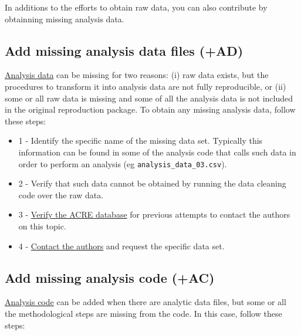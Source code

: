 \documentclass[]{book}
\providecommand{\tightlist}{%
  \setlength{\itemsep}{0pt}\setlength{\parskip}{0pt}}
\begin{document}
In additions to the efforts to obtain raw data, you can also contribute by obtainning missing analysis data.

\hypertarget{ad}{%
\subsection{Add missing analysis data files (+AD)}\label{ad}}

\protect\hyperlink{describe-inputs}{Analysis data} can be missing for two reasons: (i) raw data exists, but the procedures to transform it into analysis data are not fully reproducible, or (ii) some or all raw data is missing and some of all the analysis data is not included in the original reproduction package. To obtain any missing analysis data, follow these steps:

\begin{itemize}
\tightlist
\item
  1 - Identify the specific name of the missing data set. Typically this information can be found in some of the analysis code that calls such data in order to perform an analysis (eg \texttt{analysis\_data\_03.csv}).\\
\item
  2 - Verify that such data cannot be obtained by running the data cleaning code over the raw data.\\
\item
  3 - \href{ADD\%20LINK}{Verify the ACRE database} for previous attempts to contact the authors on this topic.\\
\item
  4 - \protect\hyperlink{tips-for-communication}{Contact the authors} and request the specific data set.
\end{itemize}

\hypertarget{ac}{%
\subsection{Add missing analysis code (+AC)}\label{ac}}

\protect\hyperlink{describe-inputs}{Analysis code} can be added when there are analytic data files, but some or all the methodological steps are missing from the code. In this case, follow these steps:
\end{document}
